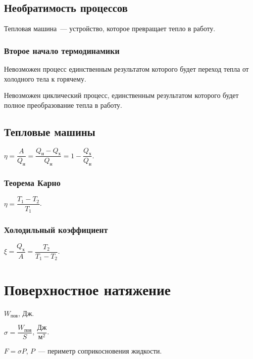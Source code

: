 \documentclass[12pt]{article}
\begin{document}
	\subsection{Необратимость процессов}
	\begin{definition}
		Тепловая машина~--- устройство, которое превращает тепло в работу.
	\end{definition}
	\subsubsection{Второе начало термодинамики}
	\begin{definition}
		Невозможен процесс единственным результатом которого будет переход тепла от холодного тела к горячему.
	\end{definition}
	\begin{definition}
		Невозможен циклический процесс, единственным результатом которого будет полное преобразование тепла в работу.
	\end{definition}
	\subsection{Тепловые машины}
	\begin{definition}[КПД]
		$\eta = \dfrac{A}{Q_{\text{н}}} = \dfrac{Q_{\text{н}} - Q_{\text{х}}}{Q_{\text{н}}} = 1 - \dfrac{Q_{\text{х}}}{Q_{\text{н}}}$.
	\end{definition}
	\subsubsection{Теорема Карно}
	\begin{definition}
		$\eta = \dfrac{T_1 - T_2}{T_1}$.
	\end{definition}
	\subsubsection{Холодильный коэффициент}
	\begin{definition}
		$\xi = \dfrac{Q_{\text{х}}}{A} = \dfrac{T_2}{T_1 - T_2}$.
	\end{definition}
	\section{Поверхностное натяжение}
	\begin{definition}
		$W_{\text{пов}}$, Дж.
	\end{definition}
	\begin{definition}
		$\sigma = \dfrac{W_{\text{пов}}}{S}$, $\dfrac{\text{Дж}}{\text{м}^2}$.
	\end{definition}
	\begin{definition}
		$F = \sigma P$, $P$~--- периметр соприкосновения жидкости.
	\end{definition}
\end{document}
